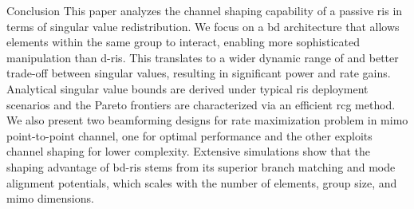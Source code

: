 \documentclass[journal]{IEEEtran}
\begin{document}
\begin{section}{Conclusion}
	This paper analyzes the channel shaping capability of a passive \gls{ris} in terms of singular value redistribution.
	We focus on a \gls{bd} architecture that allows elements within the same group to interact, enabling more sophisticated manipulation than \gls{d}-\gls{ris}.
	This translates to a wider dynamic range of and better trade-off between singular values, resulting in significant power and rate gains.
	Analytical singular value bounds are derived under typical \gls{ris} deployment scenarios and the Pareto frontiers are characterized via an efficient \gls{rcg} method.
	We also present two beamforming designs for rate maximization problem in \gls{mimo} point-to-point channel, one for optimal performance and the other exploits channel shaping for lower complexity.
	Extensive simulations show that the shaping advantage of \gls{bd}-\gls{ris} stems from its superior branch matching and mode alignment potentials, which scales with the number of elements, group size, and \gls{mimo} dimensions.

\end{section}
\end{document}
